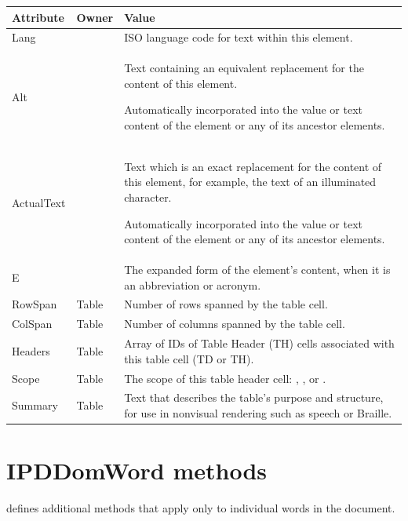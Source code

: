 \documentclass[letterpaper,12pt,english,openany,oneside]{sphinxmanual}
\begin{document}
\begin{savenotes}\sphinxattablestart
\centering
\begin{tabulary}{\linewidth}[t]{|T|T|T|}
\hline
\sphinxstyletheadfamily 
Attribute
&\sphinxstyletheadfamily 
Owner
&\sphinxstyletheadfamily 
Value
\\
\hline
Lang
&&
ISO language code for text within this element.
\\
\hline
Alt
&&
Text containing an equivalent replacement for the content of this element.

Automatically incorporated into the value or text content of the element or any of its ancestor elements.
\\
\hline
ActualText
&&
Text which is an exact replacement for the content of this element, for example, the text of an illuminated character.

Automatically incorporated into the value or text content of the element or any of its ancestor elements.
\\
\hline
E
&&
The expanded form of the element’s content, when it is an abbreviation or acronym.
\\
\hline
RowSpan
&
Table
&
Number of rows spanned by the table cell.
\\
\hline
ColSpan
&
Table
&
Number of columns spanned by the table cell.
\\
\hline
Headers
&
Table
&
Array of IDs of Table Header (TH) cells associated with this table cell (TD or TH).
\\
\hline
Scope
&
Table
&
The scope of this table header cell:  ,  , or  .
\\
\hline
Summary
&
Table
&
Text that describes the table’s purpose and structure, for use in non\sphinxhyphen{}visual rendering such as speech or Braille.
\\
\hline
\end{tabulary}
\par
\sphinxattableend\end{savenotes}




\section{IPDDomWord methods}
\label{\detokenize{Access_DOM:ipddomword-methods}}
 defines additional methods that apply only to individual words in the document.
\end{document}
